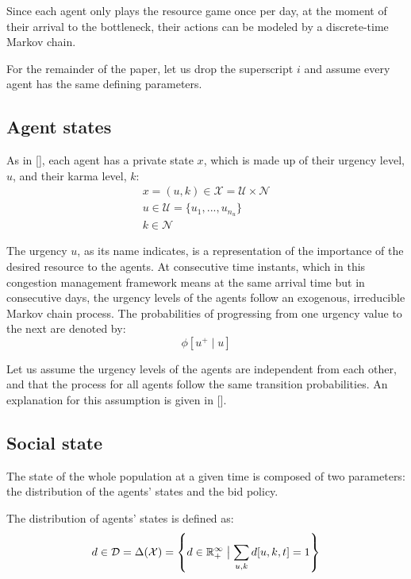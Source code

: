 \documentclass[a4paper,11pt,twoside]{book}
\let\oldcite\cite
\renewcommand*\cite[1]{{[\oldcite{#1}]}}
\begin{document}
Since each agent only plays the resource game once per day, at the moment of their arrival to the bottleneck, their actions can be modeled by a discrete-time Markov chain.

For the remainder of the paper, let us drop the superscript $i$ and assume every agent has the same defining parameters.


\subsection{Agent states}

As in \cite{KarmaGame}, each agent has a private state $x$, which is made up of their urgency level, $u$, and their karma level, $k$:
\begin{gather*}
    x = (u, k) \in \mathcal{X} = \mathcal{U} \times \mathcal{N} \\
    u \in \mathcal{U} = \{u_1, ..., u_{n_u}\} \\
    k \in \mathcal{N}
\end{gather*}

The urgency $u$, as its name indicates, is a representation of the importance of the desired resource to the agents. At consecutive time instants, which in this congestion management framework means at the same arrival time but in consecutive days, the urgency levels of the agents follow an exogenous, irreducible Markov chain process. The probabilities of progressing from one urgency value to the next are denoted by:
\begin{equation*}
    \phi [u^+ \mid u]
\end{equation*}

Let us assume the urgency levels of the agents are independent from each other, and that the process for all agents follow the same transition probabilities. An explanation for this assumption is given in \cite{KarmaGame}.


\subsection{Social state}

The state of the whole population at a given time is composed of two parameters: the distribution of the agents' states and the bid policy.

The distribution of agents' states is defined as:
\begin{equation*}
    d\in \mathcal{D} = \Delta(\mathcal{X}) = \left\{d \in \mathbb{R}_+^{\infty} \bigm\vert \sum_{u,k} d[u,k,t] = 1 \right\}
\end{equation*}
\end{document}
